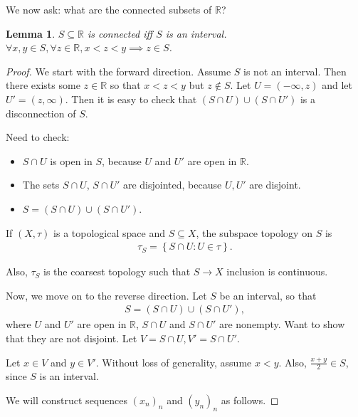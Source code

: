 \documentclass[12pt]{article}
\newtheorem*{lemma}{Lemma}
\newcommand{\RR}{\mathbb{R}}
\begin{document}
We now ask: what are the connected subsets of $\RR$? \\

\begin{lemma}
  $S \subseteq \RR$ is connected iff $S$ is an interval.  $\forall x, y \in S, \forall z \in \RR, x < z < y \implies z \in S$. \\
\end{lemma}

\begin{proof}
  We start with the forward direction.  Assume $S$ is not an interval.  Then there exists some $z \in \RR$ so that $x < z < y$ but $z \not \in S$.  Let $U = (- \infty, z)$ and let $U' = (z, \infty)$.  Then it is easy to check that $(S \cap U) \cup (S \cap U')$ is a disconnection of $S$.

  Need to check:
  \begin{itemize}
    \item $S \cap U$ is open in $S$, because $U$ and $U'$ are open in $\RR$.
    \item The sets $S \cap U$, $S \cap U'$ are disjointed, because $U, U'$ are disjoint.
    \item $S = (S \cap U) \cup (S \cap U')$.
  \end{itemize}

  If $(X, \tau)$ is a topological space and $S \subseteq X$, the subspace topology on $S$ is 
  \begin{align*}
    \tau_{S} = \left\{ S \cap U: U \in \tau \right\}.
  \end{align*}

  Also, $\tau_S$ is the coarsest topology such that $S \to X$ inclusion is continuous.

  Now, we move on to the reverse direction.  Let $S$ be an interval, so that
  \begin{align*}
    S = (S \cap U) \cup (S \cap U'),
  \end{align*}
  where $U$ and $U'$ are open in $\RR$, $S \cap U$ and $S \cap U'$ are nonempty.  Want to show that they are not disjoint.  Let $V = S \cap U, V' = S \cap U'$.

  Let $x \in V$ and $y \in V'$.  Without loss of generality, assume $x < y$.  Also, $\frac{x+y}{2} \in S$, since $S$ is an interval.

  We will construct sequences $(x_n)_n$ and $(y_n)_n$ as follows.


\end{proof}
\end{document}
